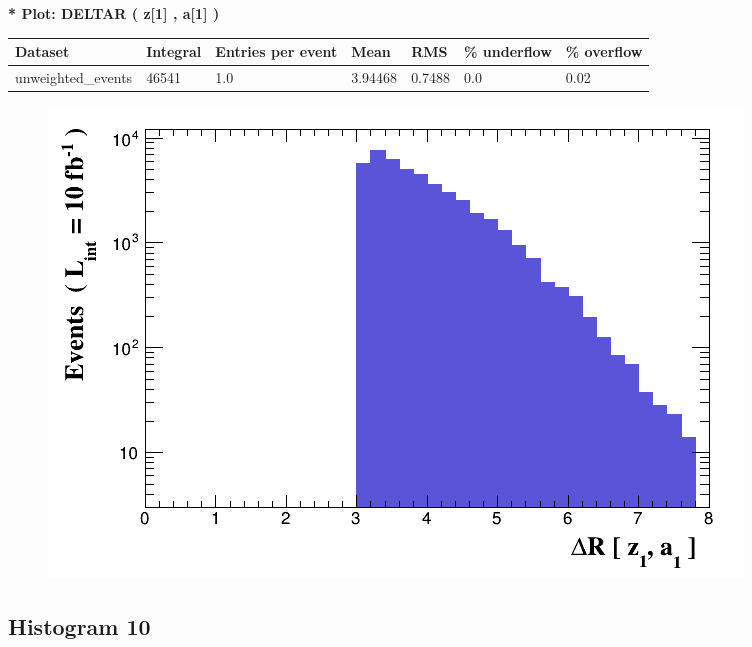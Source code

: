 \documentclass[a4paper, 10pt]{article}
\begin{document}
\textbf{* Plot: DELTAR ( z[1] , a[1] ) }\\
   \begin{table}[H]
  \begin{center}
    \begin{tabular}{|m{23.0mm}|m{23.0mm}|m{18.0mm}|m{19.0mm}|m{19.0mm}|m{19.0mm}|m{19.0mm}|}
      \hline
      {\cellcolor{yellow}         Dataset}& {\cellcolor{yellow}         Integral}& {\cellcolor{yellow}         Entries per event}& {\cellcolor{yellow}         Mean}& {\cellcolor{yellow}         RMS}& {\cellcolor{yellow}         \% underflow}& {\cellcolor{yellow}         \% overflow}\\
      \hline
      {\cellcolor{white}         unweighted\_events}& {\cellcolor{white}         46541}& {\cellcolor{white}         1.0}& {\cellcolor{white}         3.94468}& {\cellcolor{white}         0.7488}& {\cellcolor{green}         0.0}& {\cellcolor{green}         0.02}\\
\hline
    \end{tabular}
  \end{center}
\end{table}

\begin{figure}[H]
  \begin{center}
    \includegraphics[scale=0.45]{selection_8.png}\\
\caption{   }
  \end{center}
\end{figure}
      \newpage
\subsection{ Histogram 10}
\end{document}

